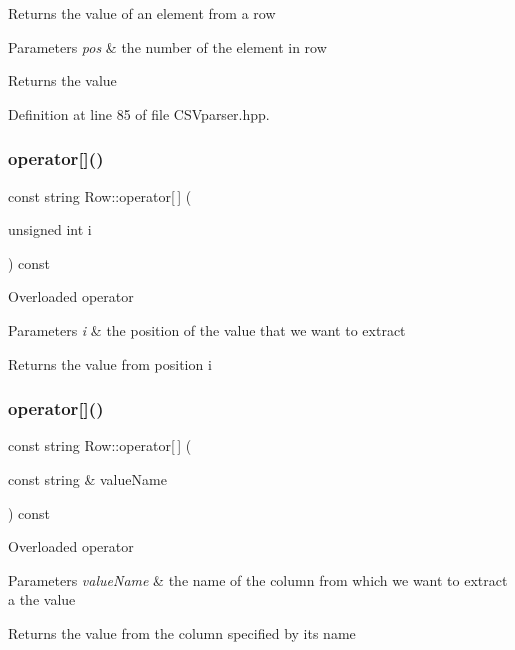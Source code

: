 Returns the value of an element from a row 
\begin{DoxyParams}{Parameters}
{\em pos} & the number of the element in row \\
\hline
\end{DoxyParams}
\begin{DoxyReturn}{Returns}
the value 
\end{DoxyReturn}


Definition at line 85 of file C\+S\+Vparser.\+hpp.

\mbox{\label{class_row_a705ecee70126716fbe16337e4a2b8764}} 
\subsubsection{operator[]()\hspace{0.1cm}{\footnotesize\ttfamily [1/2]}}
{\footnotesize\ttfamily const string Row\+::operator[$\,$] (\begin{DoxyParamCaption}\item[{unsigned int}]{i }\end{DoxyParamCaption}) const}

Overloaded operator 
\begin{DoxyParams}{Parameters}
{\em i} & the position of the value that we want to extract \\
\hline
\end{DoxyParams}
\begin{DoxyReturn}{Returns}
the value from position i 
\end{DoxyReturn}
\mbox{\label{class_row_a42f23dd69d591da253b7428647f16ff8}} 
\subsubsection{operator[]()\hspace{0.1cm}{\footnotesize\ttfamily [2/2]}}
{\footnotesize\ttfamily const string Row\+::operator[$\,$] (\begin{DoxyParamCaption}\item[{const string \&}]{value\+Name }\end{DoxyParamCaption}) const}

Overloaded operator 
\begin{DoxyParams}{Parameters}
{\em value\+Name} & the name of the column from which we want to extract a the value \\
\hline
\end{DoxyParams}
\begin{DoxyReturn}{Returns}
the value from the column specified by its name 
\end{DoxyReturn}
\mbox{\label{class_row_ac18926c6dc8fdfb37894009a8c80fdb1}} 
